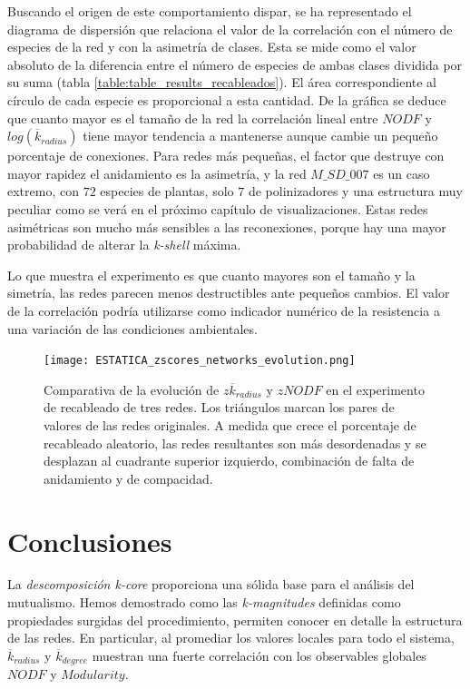 Buscando el origen de este comportamiento dispar, se ha representado el diagrama de dispersión que relaciona el valor de la correlación con el número de especies de la red y con la asimetría de clases. Esta se mide como el valor absoluto de la diferencia entre el número de especies de ambas clases dividida por su suma (tabla \ref{table:table_results_recableados}). El área correspondiente al círculo de cada especie es proporcional a esta cantidad. De la gráfica se deduce que cuanto mayor es el tamaño de la red la correlación lineal entre $NODF$ y $log(\overline {k}_{radius})$ tiene mayor tendencia a mantenerse aunque cambie un pequeño porcentaje de conexiones. Para redes más pequeñas, el factor que destruye con mayor rapidez el anidamiento es la asimetría, y la red $M\_SD\_007$ es un caso extremo, con $72$ especies de plantas, solo $7$ de polinizadores y una estructura muy peculiar como se verá en el próximo capítulo de visualizaciones. Estas redes asimétricas son mucho más sensibles a las reconexiones, porque hay una mayor probabilidad de alterar la \textit{k-shell} máxima.

Lo que muestra el experimento es que cuanto  mayores son el tamaño y la simetría, las redes parecen menos destructibles ante pequeños cambios. El valor de la correlación podría utilizarse como indicador numérico de la resistencia a una variación de las condiciones ambientales.

\begin{figure}[h!]
\centering
\texttt{[image: ESTATICA\_zscores\_networks\_evolution.png]}
\caption {Comparativa de la evolución de $z \overline {k}_{radius}$ y $zNODF$ en el experimento de recableado de tres redes. Los triángulos marcan los pares de valores de las redes originales. A medida que crece el porcentaje de recableado aleatorio, las redes resultantes son más desordenadas y se desplazan al cuadrante superior izquierdo, combinación de falta de anidamiento y de compacidad.}
\label{fig:ESTATICA_asimetria_corr}
\end{figure}

\section{Conclusiones}

La \textit{descomposición k-core} proporciona una sólida base para el análisis del mutualismo. Hemos demostrado como las \textit{k-magnitudes} definidas como propiedades surgidas del procedimiento, permiten conocer en detalle la estructura de las redes. En particular, al promediar los valores locales para todo el sistema, $\overline {k}_{radius}$ y $\overline {k}_{degree}$ muestran una fuerte correlación con los observables globales $NODF$ y $Modularity$. 

